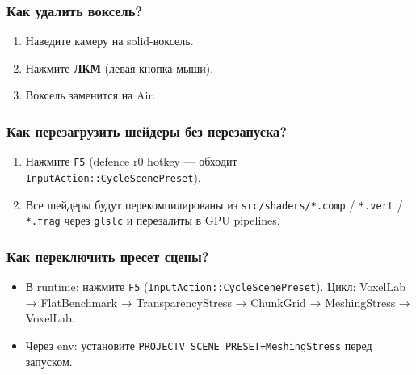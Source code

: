 \documentclass[
  11pt,a4paper,oneside]{article}
\providecommand{\tightlist}{%
  \setlength{\itemsep}{0pt}\setlength{\parskip}{0pt}}
\providecommand{\tightlist}{%
  \setlength{\itemsep}{0pt}\setlength{\parskip}{0pt}}
\begin{document}
\subsubsection{Как удалить воксель?}\label{ux43aux430ux43a-ux443ux434ux430ux43bux438ux442ux44c-ux432ux43eux43aux441ux435ux43bux44c}

\begin{enumerate}
\def\labelenumi{\arabic{enumi}.}
\tightlist
\item
  Наведите камеру на solid-воксель.
\item
  Нажмите \textbf{ЛКМ} (левая кнопка мыши).
\item
  Воксель заменится на Air.
\end{enumerate}

\subsubsection{Как перезагрузить шейдеры без перезапуска?}\label{ux43aux430ux43a-ux43fux435ux440ux435ux437ux430ux433ux440ux443ux437ux438ux442ux44c-ux448ux435ux439ux434ux435ux440ux44b-ux431ux435ux437-ux43fux435ux440ux435ux437ux430ux43fux443ux441ux43aux430}

\begin{enumerate}
\def\labelenumi{\arabic{enumi}.}
\tightlist
\item
  Нажмите \texttt{F5} (defence r0 hotkey --- обходит \texttt{InputAction::CycleScenePreset}).
\item
  Все шейдеры будут перекомпилированы из \texttt{src/shaders/*.comp} / \texttt{*.vert} / \texttt{*.frag} через \texttt{glslc} и перезалиты в GPU pipelines.
\end{enumerate}

\subsubsection{Как переключить пресет сцены?}\label{ux43aux430ux43a-ux43fux435ux440ux435ux43aux43bux44eux447ux438ux442ux44c-ux43fux440ux435ux441ux435ux442-ux441ux446ux435ux43dux44b}

\begin{itemize}
\tightlist
\item
  В runtime: нажмите \texttt{F5} (\texttt{InputAction::CycleScenePreset}). Цикл: VoxelLab → FlatBenchmark → TransparencyStress → ChunkGrid → MeshingStress → VoxelLab.
\item
  Через env: установите \texttt{PROJECTV\_SCENE\_PRESET=MeshingStress} перед запуском.
\end{itemize}
\end{document}
